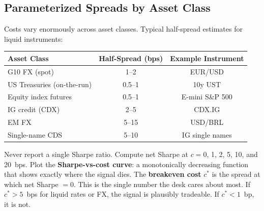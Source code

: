 \subsection{Parameterized Spreads by Asset Class}

Costs vary enormously across asset classes.  Typical half-spread estimates for liquid instruments:

\begin{center}
\begin{tabular}{lcc}
\toprule
\textbf{Asset Class} & \textbf{Half-Spread (bps)} & \textbf{Example Instrument} \\
\midrule
G10 FX (spot)        & 1--2   & EUR/USD \\
US Treasuries (on-the-run) & 0.5--1 & 10y UST \\
Equity index futures  & 0.5--1 & E-mini S\&P 500 \\
IG credit (CDX)       & 2--5   & CDX.IG \\
EM FX                 & 5--15  & USD/BRL \\
Single-name CDS       & 5--10  & IG single names \\
\bottomrule
\end{tabular}
\end{center}

\begin{keyidea}
Never report a single Sharpe ratio.  Compute net Sharpe at $c = 0$, 1, 2, 5, 10, and 20~bps.  Plot the \textbf{Sharpe-vs-cost curve}: a monotonically decreasing function that shows exactly where the signal dies.  The \textbf{breakeven cost} $c^*$ is the spread at which net Sharpe $= 0$.  This is the single number the desk cares about most.  If $c^* > 5$~bps for liquid rates or FX, the signal is plausibly tradeable.  If $c^* < 1$~bp, it is not.
\end{keyidea}

